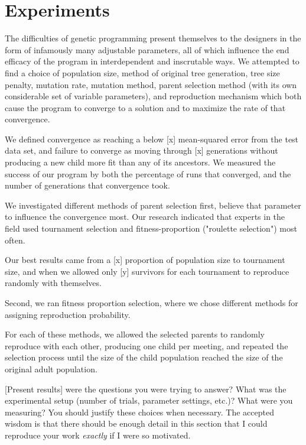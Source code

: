 
\section{Experiments}
\label{sec:expts}

The difficulties of genetic programming present themselves to the designers in the form of infamously many adjustable parameters, all of which influence the end efficacy of the program in interdependent and inscrutable ways. We attempted to find a choice of population size, method of original tree generation, tree size penalty, mutation rate, mutation method, parent selection method (with its own considerable set of variable parameters), and reproduction mechanism which both cause the program to converge to a solution and to maximize the rate of that convergence. 

We defined convergence as reaching a below [x] mean-squared error from the test data set, and failure to converge as moving through [x] generations without producing a new child more fit than any of its ancestors. We measured the success of our program by both the percentage of runs that converged, and the number of generations that convergence took. 


We investigated different methods of parent selection first, believe that parameter to influence the convergence most. Our research indicated that experts in the field used tournament selection and fitness-proportion ("roulette selection") most often. 

Our best results came from a [x] proportion of population size to tournament size, and when we allowed only [y] survivors for each tournament to reproduce randomly with themselves. 



Second, we ran fitness proportion selection, where we chose different methods for assigning reproduction probability.



For each of these methods, we allowed the selected parents to randomly reproduce with each other, producing one child per meeting, and repeated the selection process until the size of the child population reached the size of the original adult population. 


[Present results]
were the questions you were trying to answer? What was the
experimental setup (number of trials, parameter settings, etc.)? What
were you measuring? You should justify these choices when
necessary. The accepted wisdom is that there should be enough detail
in this section that I could reproduce your work \emph{exactly} if I
were so motivated.
